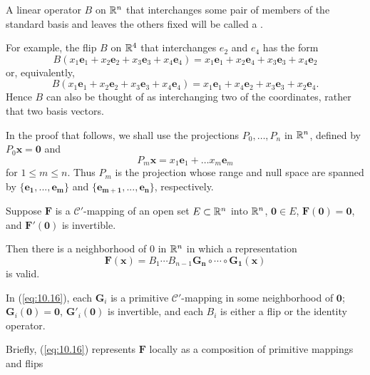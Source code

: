 \begin{mydef}
    \label{mydef:10.6}
    A linear operator $B$ on ${\protect\mathbb R}^n$ that interchanges some pair of members of the standard basis and leaves the others fixed will be called a .

    For example, the flip $B$ on ${\protect\mathbb R}^4$ that interchanges $e_2$ and $e_4$ has the form
    \begin{equation}
        \label{eq:10.13}
        B(x_1 \mathbf{e}_1 +
        x_2 \mathbf{e}_2 +
        x_3 \mathbf{e}_3 +
        x_4 \mathbf{e}_4) =
        x_1 \mathbf{e}_1 +
        x_2 \mathbf{e}_4 +
        x_3 \mathbf{e}_3 +
        x_4 \mathbf{e}_2
    \end{equation}
    or, equivalently,
    \begin{equation}
        \label{eq:10.14}
        B(x_1 \mathbf{e}_1 +
        x_2 \mathbf{e}_2 +
        x_3 \mathbf{e}_3 +
        x_4 \mathbf{e}_4) =
        x_1 \mathbf{e}_1 +
        x_4 \mathbf{e}_2 +
        x_3 \mathbf{e}_3 +
        x_2 \mathbf{e}_4 .
    \end{equation}
    Hence $B$ can also be thought of as interchanging two of the coordinates,
    rather that two basis vectors.

    In the proof that follows, we shall use the projections $P_0,\dots,P_n$ in ${\protect\mathbb R}^n$, defined by $P_0 \mathbf{x = 0}$ and
    \begin{equation}
        \label{eq:10.15}
        P_m \mathbf{x} =
        x_1 \mathbf{e}_1 + \dots
        x_m \mathbf{e}_m
    \end{equation}
    for $1 \leq m \leq n$.
    Thus $P_m$ is the projection whose range and null space are spanned by $\{\mathbf{e_1,...,e_m}\}$ and $\{\mathbf{e_{m+1},...,e_n}\}$,
    respectively.
\end{mydef}

\begin{thm}
    \label{thm:10.7}
    Suppose $\mathbf{F}$ is a $\mathscr{C}'$-mapping of an open set $E \subset {\protect\mathbb R}^n$ into ${\protect\mathbb R}^n$, $\mathbf{0} \in E$, $\mathbf{F(0) = 0}$, and $\mathbf{F'(0)}$ is invertible.

    Then there is a neighborhood of $0$ in ${\protect\mathbb R}^n$ in which a representation
    \begin{equation}
        \label{eq:10.16}
        \mathbf{F(x)} = B_1 \cdots B_{n-1} \mathbf{G_n \circ \cdots \circ G_1(x)}
    \end{equation}
    is valid.

    In (\ref{eq:10.16}), each $\mathbf{G}_i$ is a primitive $\mathscr{C}'$-mapping in some neighborhood of $\mathbf{0}$;
    $\mathbf{G}_i(\mathbf{0})=\mathbf{0}$, $\mathbf{G}'_i(\mathbf{0})$ is invertible, and each $B_i$ is either a flip or the identity operator.
\end{thm}

Briefly, (\ref{eq:10.16}) represents $\mathbf{F}$ locally as a composition of primitive mappings and flips



